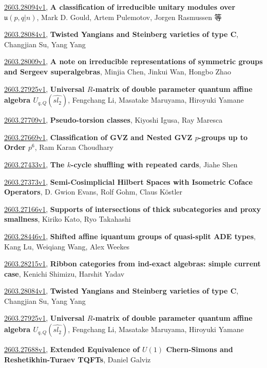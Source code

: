 \documentclass[9pt, a4paper]{article}
\theoremstyle{plain}
\theoremstyle{definition}
\theoremstyle{remark}
\newcommand{\arxiv}[3]{\href{https://arxiv.org/abs/#1}{#1}, \textbf{\textcolor{arxivblue}{#2}}, #3}
\begin{document}
\arxiv{2603.28094v1}{A classification of irreducible unitary modules over $\mathfrak{u}(p,q|n)$}{Mark D. Gould, Artem Pulemotov, Jorgen Rasmussen 等}

\arxiv{2603.28084v1}{Twisted Yangians and Steinberg varieties of type C}{Changjian Su, Yang Yang}

\arxiv{2603.28009v1}{A note on irreducible representations of symmetric groups and Sergeev superalgebras}{Minjia Chen, Jinkui Wan, Hongbo Zhao}

\arxiv{2603.27925v1}{Universal $R$-matrix of double parameter quantum affine algebra $U_{q,Q}({\hat {sl_2}})$}{Fengchang Li, Masatake Maruyama, Hiroyuki Yamane}

\arxiv{2603.27709v1}{Pseudo-torsion classes}{Kiyoshi Igusa, Ray Maresca}

\arxiv{2603.27669v1}{Classification of GVZ and Nested GVZ $p$-groups up to Order $p^6$}{Ram Karan Choudhary}

\arxiv{2603.27433v1}{The $k$-cycle shuffling with repeated cards}{Jiahe Shen}

\arxiv{2603.27373v1}{Semi-Cosimplicial Hilbert Spaces with Isometric Coface Operators}{D. Gwion Evans, Rolf Gohm, Claus Köstler}

\arxiv{2603.27166v1}{Supports of intersections of thick subcategories and proxy smallness}{Kiriko Kato, Ryo Takahashi}

\arxiv{2603.28446v1}{Shifted affine iquantum groups of quasi-split ADE types}{Kang Lu, Weiqiang Wang, Alex Weekes}

\arxiv{2603.28215v1}{Ribbon categories from ind-exact algebras: simple current case}{Kenichi Shimizu, Harshit Yadav}

\arxiv{2603.28084v1}{Twisted Yangians and Steinberg varieties of type C}{Changjian Su, Yang Yang}

\arxiv{2603.27925v1}{Universal $R$-matrix of double parameter quantum affine algebra $U_{q,Q}({\hat {sl_2}})$}{Fengchang Li, Masatake Maruyama, Hiroyuki Yamane}

\arxiv{2603.27688v1}{Extended Equivalence of $U(1)$ Chern-Simons and Reshetikhin-Turaev TQFTs}{Daniel Galviz}

\end{document}
